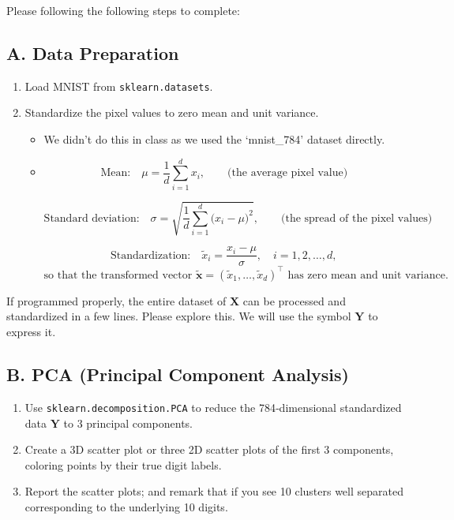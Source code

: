 \documentclass[12pt]{article}
\begin{document}
Please following the following steps to complete:
\subsection*{A. Data Preparation}
\begin{enumerate}
  \item Load MNIST from \texttt{sklearn.datasets}.
  \item Standardize the pixel values to zero mean and unit variance.
  \begin{itemize}
      \item We didn't do this in class as we used the `mnist\_784' dataset directly. 
      \item %

\[
\text{Mean:}\quad
\mu = \frac{1}{d} \sum_{i=1}^d x_i,
\qquad
\text{(the average pixel value)}
\]

\[
\text{Standard deviation:}\quad
\sigma = \sqrt{\frac{1}{d} \sum_{i=1}^d \bigl(x_i - \mu\bigr)^2},
\qquad
\text{(the spread of the pixel values)}
\]

\[
\text{Standardization:}\quad
\tilde{x}_i = \frac{x_i - \mu}{\sigma}, 
\quad i = 1,2,\dots,d,
\]
\[
\text{so that the transformed vector }
\tilde{\bm{x}} = (\tilde{x}_1,\dots,\tilde{x}_d)^\top
\text{ has zero mean and unit variance.}
\]

  \end{itemize}
\end{enumerate}

If programmed properly, the entire dataset of $\bm{X}$ can be processed and standardized in a few lines. Please explore this. We will use the symbol $\bm{Y}$ to express it.

\subsection*{B. PCA (Principal Component Analysis)}
\begin{enumerate}
  \item Use \texttt{sklearn.decomposition.PCA} to reduce the 784‐dimensional standardized data $\bm{Y}$ to 3 principal components.
  \item Create a 3D scatter plot or three 2D scatter plots of the first 3 components, coloring points by their true digit labels. 
  \item Report the scatter plots; and remark that if you see 10 clusters well separated corresponding to the underlying 10 digits. 
\end{enumerate}
\end{document}
